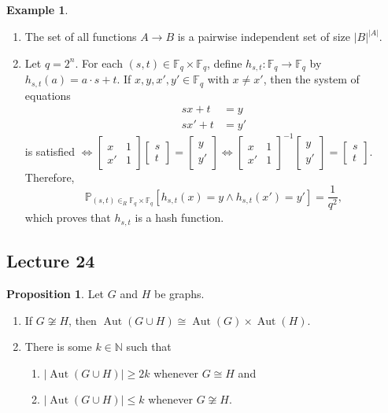 \documentclass[10pt,letterpaper,cm]{nupset}
\theoremstyle{definition}
\newtheorem{exmp}[definition]{Example}
\theoremstyle{theorem}
\newtheorem{prop}[definition]{Proposition}
\theoremstyle{remark}
\newcommand{\F}{\mathbb F}
\newcommand{\N}{\mathbb N}
\newcommand{\1}{\mathbf{1}}
\newcommand{\0}{\vec 0}
\DeclareMathOperator{\aut}{Aut}
\begin{document}
\begin{exmp} $ $
\begin{enumerate}
\item The set of all functions $A \to B$ is a pairwise independent set of size $\left\lvert{B}\right\rvert^{\left\lvert{A}\right\rvert}$. 
\item
Let $q= 2^n$. For each $\left(s,t\right) \in \F_q \times \F_q$, define $h_{s,t} : \F_q \to \F_q$ by $h_{s,t}(a) = a \cdot s +t$. If $x,y, x', y' \in \F_q$ with $x \ne x'$, then the system of equations \begin{align*} 
sx + t & = y \\ sx' +t & = y'
\end{align*} 
is satisfied $\iff  \begin{bmatrix}  x & 1 \\ x' & 1   \end{bmatrix} \begin{bmatrix} s \\ t    \end{bmatrix} = \begin{bmatrix} y \\ y' \end{bmatrix} \iff  \begin{bmatrix}  x & 1 \\ x' & 1   \end{bmatrix}^{-1} \begin{bmatrix} y \\ y' \end{bmatrix}  = \begin{bmatrix} s \\ t    \end{bmatrix} $. Therefore, $$\mathbb{P}_{(s,t)\in_R \F_q\times \F_q}\left[h_{s,t}(x) = y \land h_{s,t}(x') = y'\right] = \frac{1}{q^2},$$ which proves that $h_{s,t}$ is a hash function.
\end{enumerate}
\end{exmp}

\subsection{Lecture 24}

\begin{prop}
Let $G$ and $H$ be graphs. 
\begin{enumerate}
\item If $G \not\cong H$, then $\aut(G \cup H) \cong \aut(G) \times \aut(H)$. 
\item There is some $k\in \N$ such that  
\begin{enumerate}
\item $\left\lvert{\aut(G \cup H)}\right\rvert \geq 2k$ whenever $G \cong H$  and 
\item $\left\lvert{\aut(G \cup H)}\right\rvert \leq k$ whenever $G \not\cong H$. 
\end{enumerate}
\end{enumerate}
\end{prop}
\end{document}
